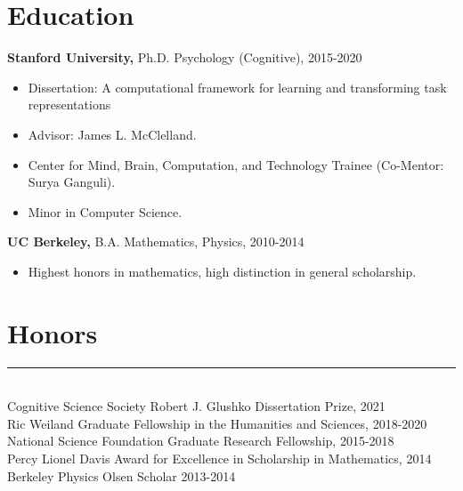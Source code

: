 \documentclass[margin]{res}
\begin{document}
 
 
 
\address{{\bf Email} \\ andrewlampinen@gmail.com}
\address{{\bf Website} \\\url{https://lampinen.github.io}}
\begin{resume} 
\section{Education} 
{\bf Stanford University,} Ph.D. Psychology (Cognitive), 2015-2020
\begin{itemize} \itemsep -2pt \item Dissertation: A computational framework for learning and transforming task representations \item Advisor: James L. McClelland. \item Center for Mind, Brain, Computation, and Technology Trainee (Co-Mentor: Surya Ganguli). \item Minor in Computer Science.\end{itemize}
{\bf UC Berkeley,}  B.A. Mathematics, Physics, 2010-2014 \begin{itemize} \itemsep -2pt \item Highest honors in mathematics, high distinction in general scholarship.%
\end{itemize}
\vspace{1pt}\section{Honors} \vspace{-15pt} \rule{\textwidth}{0.5pt} \\[3pt]
Cognitive Science Society Robert J. Glushko Dissertation Prize, 2021 \\
Ric Weiland Graduate Fellowship in the Humanities and Sciences, 2018-2020 \\
National Science Foundation Graduate Research Fellowship, 2015-2018 \\
Percy Lionel Davis Award for Excellence in Scholarship in Mathematics, 2014 \\ 
Berkeley Physics Olsen Scholar 2013-2014 \\

\end{resume}
\end{document}
